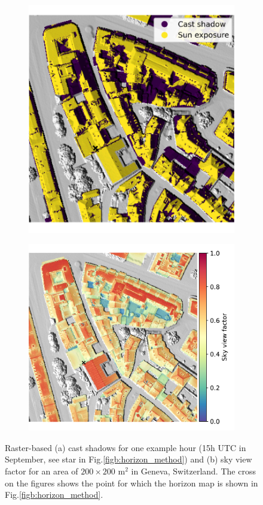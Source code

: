 \begin{figure}[htb]
	\centering
	\begin{subfigure}{.49\textwidth}
		\centering
		\includegraphics[height=.9\linewidth]{images/Figs/demo_vis_09_15h_w_cross.pdf}  
		\subcaption{}
	\end{subfigure}
	\begin{subfigure}{.49\textwidth}
		\centering
		\includegraphics[height=.9\linewidth]{images/Figs/svf_w_legend.pdf}  
		\subcaption{}
	\end{subfigure}
	\caption{Raster-based (a) cast shadows for one example hour (15h UTC in September, see star in Fig.\ref{figb:horizon_method}) and (b) sky view factor for an area of $200\times200$ m$^2$ in Geneva, Switzerland. The cross on the figures shows the point for which the horizon map is shown in Fig.\ref{figb:horizon_method}.}
	\label{fig:raster_svf_ssh}
\end{figure}


